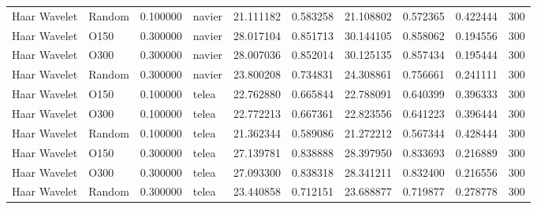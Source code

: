 \begin{table}[h]
\begin{tabular}{llrlrrrrrr}
Haar Wavelet & Random & 0.100000 & navier & 21.111182 & 0.583258 & 21.108802 & 0.572365 & 0.422444 & 300 \\
Haar Wavelet & O150 & 0.300000 & navier & 28.017104 & 0.851713 & 30.144105 & 0.858062 & 0.194556 & 300 \\
Haar Wavelet & O300 & 0.300000 & navier & 28.007036 & 0.852014 & 30.125135 & 0.857434 & 0.195444 & 300 \\
Haar Wavelet & Random & 0.300000 & navier & 23.800208 & 0.734831 & 24.308861 & 0.756661 & 0.241111 & 300 \\
Haar Wavelet & O150 & 0.100000 & telea & 22.762880 & 0.665844 & 22.788091 & 0.640399 & 0.396333 & 300 \\
Haar Wavelet & O300 & 0.100000 & telea & 22.772213 & 0.667361 & 22.823556 & 0.641223 & 0.396444 & 300 \\
Haar Wavelet & Random & 0.100000 & telea & 21.362344 & 0.589086 & 21.272212 & 0.567344 & 0.428444 & 300 \\
Haar Wavelet & O150 & 0.300000 & telea & 27.139781 & 0.838888 & 28.397950 & 0.833693 & 0.216889 & 300 \\
Haar Wavelet & O300 & 0.300000 & telea & 27.093300 & 0.838318 & 28.341211 & 0.832400 & 0.216556 & 300 \\
Haar Wavelet & Random & 0.300000 & telea & 23.440858 & 0.712151 & 23.688877 & 0.719877 & 0.278778 & 300 \\
\bottomrule
\end{tabular}


\end{table}
